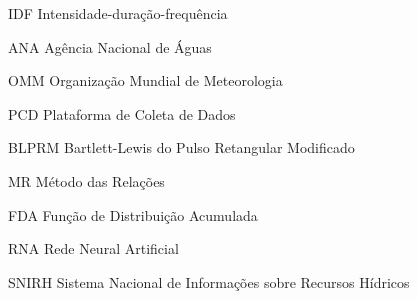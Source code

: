 \begin{siglas}
  \item[IDF] Intensidade-duração-frequência
  \item[ANA] Agência Nacional de Águas
  \item[OMM] Organização Mundial de Meteorologia
  \item[PCD] Plataforma de Coleta de Dados
  \item[BLPRM] Bartlett-Lewis do Pulso Retangular Modificado
  \item[MR] Método das Relações 
  \item[FDA] Função de Distribuição Acumulada
  \item[RNA] Rede Neural Artificial
  \item[SNIRH] Sistema Nacional de Informações sobre Recursos Hídricos 
\end{siglas}
